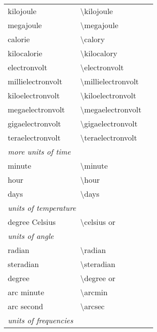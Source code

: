 \begin{longtable}{Xl>{\ttfamily\textbackslash}Xl}
     kilojoule        &\unitsignonly{\kilojoule}        &kilojoule&\cmd{\kJ}\\
     megajoule        &\unitsignonly{\megajoule}        &megajoule&\\
     calorie          &\unitsignonly{\calory}           &calory&\\
     kilocalorie      &\unitsignonly{\kilocalory}       &kilocalory&\\
     electronvolt     &\unitsignonly{\electronvolt}     &electronvolt&\cmd{\eV}\\
     millielectronvolt&\unitsignonly{\millielectronvolt}&millielectronvolt&\cmd{\meV}\\
     kiloelectronvolt &\unitsignonly{\kiloelectronvolt} &kiloelectronvolt&\cmd{\keV}\\
     megaelectronvolt &\unitsignonly{\megaelectronvolt} &megaelectronvolt&\cmd{\MeV}\\
     gigaelectronvolt &\unitsignonly{\gigaelectronvolt} &gigaelectronvolt&\cmd{\GeV}\\
     teraelectronvolt &\unitsignonly{\teraelectronvolt} &teraelectronvolt&\cmd{\TeV}\\
     \multicolumn{4}{l}{\emph{more units of time}}\\[.5ex]
     minute           &\unitsignonly{\minute}           &minute&\\
     hour             &\unitsignonly{\hour}             &hour&\\
     days             &\unitsignonly{\days}             &days&\\[1ex]
     \multicolumn{4}{l}{\emph{units of temperature}}\\[.5ex]
     degree Celsius   &\unitsignonly{\celsius}          &celsius \textrm{or} \cmd{\Celsius}&\\[1ex]
     \multicolumn{4}{l}{\emph{units of angle}}\\[.5ex]
     radian           &\unitsignonly{\radian}           &radian&\\
     steradian        &\unitsignonly{\steradian}        &steradian&\\
     degree           &\unitsignonly{\degree}           &degree \textrm{or} \cmd{\Degree}&\\
     arc minute       &\unitsignonly{\arcmin}           &arcmin&\\
     arc second       &\unitsignonly{\arcsec}           &arcsec&\\[1ex]
     \multicolumn{4}{l}{\emph{units of frequencies}}\\[.5ex]

\end{longtable}
